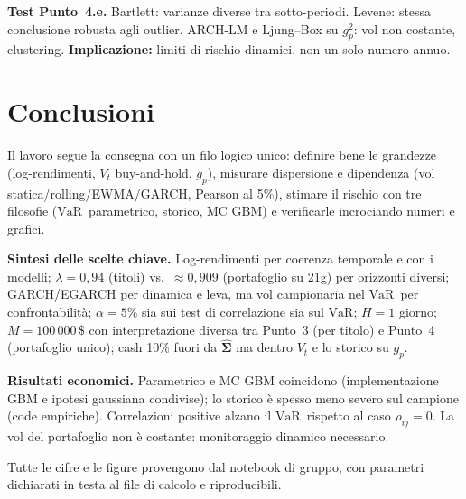 \documentclass[12pt,a4paper]{article}
\newcommand{\VaR}{\ensuremath{\mathrm{VaR}}}
\newcommand{\USD}{\ensuremath{\,\$}}
\begin{document}
\textbf{Test Punto~4.e.} Bartlett: varianze diverse tra sotto-periodi. Levene: stessa conclusione robusta agli outlier. ARCH-LM e Ljung--Box su $g_p^2$: vol non costante, clustering. \textbf{Implicazione:} limiti di rischio dinamici, non un solo numero annuo.

\section{Conclusioni}

Il lavoro segue la consegna con un filo logico unico: definire bene le grandezze (log-rendimenti, $V_t$ buy-and-hold, $g_p$), misurare dispersione e dipendenza (vol statica/rolling/EWMA/GARCH, Pearson al 5\%), stimare il rischio con tre filosofie (\VaR\ parametrico, storico, MC GBM) e verificarle incrociando numeri e grafici.

\textbf{Sintesi delle scelte chiave.} Log-rendimenti per coerenza temporale e con i modelli; $\lambda=0{,}94$ (titoli) vs.\ $\approx 0{,}909$ (portafoglio su 21g) per orizzonti diversi; GARCH/EGARCH per dinamica e leva, ma vol campionaria nel \VaR\ per confrontabilità; $\alpha=5\%$ sia sui test di correlazione sia sul \VaR; $H=1$ giorno; $M=100\,000\USD$ con interpretazione diversa tra Punto~3 (per titolo) e Punto~4 (portafoglio unico); cash 10\% fuori da $\hat{\boldsymbol\Sigma}$ ma dentro $V_t$ e lo storico su $g_p$.

\textbf{Risultati economici.} Parametrico e MC GBM coincidono (implementazione GBM e ipotesi gaussiana condivise); lo storico è spesso meno severo sul campione (code empiriche). Correlazioni positive alzano il \VaR\ rispetto al caso $\rho_{ij}=0$. La vol del portafoglio non è costante: monitoraggio dinamico necessario.

Tutte le cifre e le figure provengono dal notebook di gruppo, con parametri dichiarati in testa al file di calcolo e riproducibili.
\end{document}
